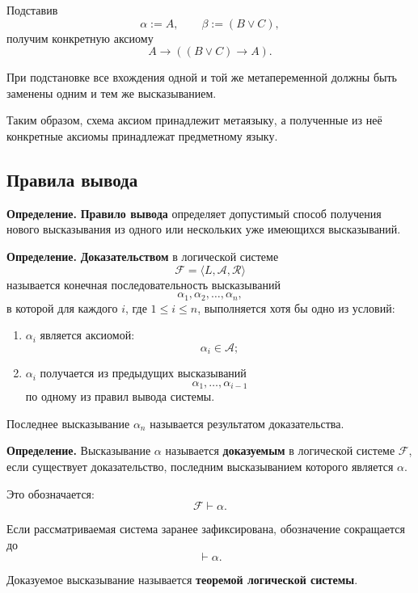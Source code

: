 \documentclass[12pt,a4paper,oneside,openany]{book}
\theoremstyle{definition}
\theoremstyle{plain}
\theoremstyle{remark}
\begin{document}
Подставив
\[
\alpha:=A,
\qquad
\beta:=(B\lor C),
\]
получим конкретную аксиому
\[
A\to((B\lor C)\to A).
\]

При подстановке все вхождения одной и той же метапеременной должны быть
заменены одним и тем же высказыванием.

Таким образом, схема аксиом принадлежит метаязыку, а полученные из неё
конкретные аксиомы принадлежат предметному языку.

\subsection{Правила вывода}

\textbf{Определение.}
\textbf{Правило вывода} определяет допустимый способ получения нового
высказывания из одного или нескольких уже имеющихся высказываний.



\vspace{7mm}

\textbf{Определение.}
\textbf{Доказательством} в логической системе
\[
\mathcal{F}=\langle L,\mathcal{A},\mathcal{R}\rangle
\]
называется конечная последовательность высказываний
\[
\alpha_1,\alpha_2,\ldots,\alpha_n,
\]
в которой для каждого \(i\), где \(1\leq i\leq n\), выполняется хотя бы
одно из условий:
\begin{enumerate}
    \item \(\alpha_i\) является аксиомой:
          \[
          \alpha_i\in\mathcal{A};
          \]

    \item \(\alpha_i\) получается из предыдущих высказываний
          \[
          \alpha_1,\ldots,\alpha_{i-1}
          \]
          по одному из правил вывода системы.
\end{enumerate}

Последнее высказывание \(\alpha_n\) называется результатом
доказательства.

\vspace{7mm}

\textbf{Определение.}
Высказывание \(\alpha\) называется \textbf{доказуемым} в логической
системе \(\mathcal{F}\), если существует доказательство, последним
высказыванием которого является \(\alpha\).

Это обозначается:
\[
\mathcal{F}\vdash\alpha.
\]

Если рассматриваемая система заранее зафиксирована, обозначение
сокращается до
\[
\vdash\alpha.
\]

Доказуемое высказывание называется \textbf{теоремой логической системы}.
\end{document}
